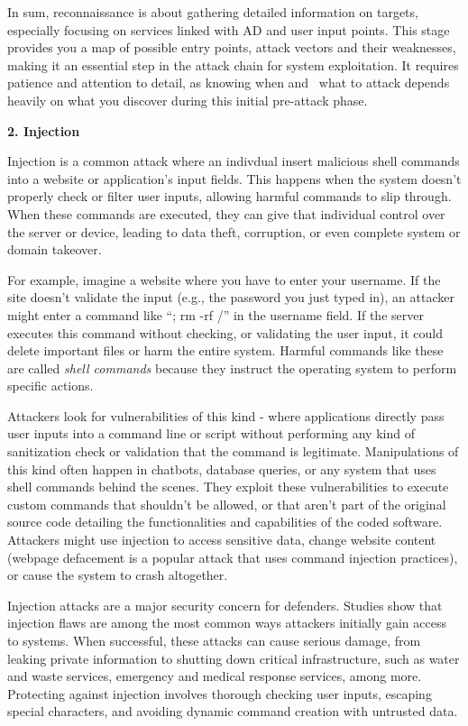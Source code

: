 In sum, reconnaissance is about gathering detailed information on targets, especially focusing on services linked with AD and user input points. This stage provides you a map of possible entry points, attack vectors and their weaknesses, making it an essential step in the attack chain for system exploitation. It requires patience and attention to detail, as knowing when and  what to attack depends heavily on what you discover during this initial pre-attack phase.

\textbf{2. Injection}

Injection is a common attack where an indivdual insert malicious shell commands into a website or application’s input fields. This happens when the system doesn’t properly check or filter user inputs, allowing harmful commands to slip through. When these commands are executed, they can give that individual control over the server or device, leading to data theft, corruption, or even complete system or domain takeover.

For example, imagine a website where you have to enter your username. If the site doesn’t validate the input (e.g., the password you just typed in), an attacker might enter a command like “; rm -rf /” in the username field. If the server executes this command without checking, or validating the user input, it could delete important files or harm the entire system. Harmful commands like these are called \textit{shell commands} because they instruct the operating system to perform specific actions.

Attackers look for vulnerabilities of this kind - where applications directly pass user inputs into a command line or script without performing any kind of sanitization check or validation that the command is legitimate. Manipulations of this kind often happen in chatbots, database queries, or any system that uses shell commands behind the scenes. They exploit these vulnerabilities to execute custom commands that shouldn’t be allowed, or that aren’t part of the original source code detailing the functionalities and capabilities of the coded software. Attackers might use injection to access sensitive data, change website content (webpage defacement is a popular attack that uses command injection practices), or cause the system to crash altogether.

Injection attacks are a major security concern for defenders. Studies show that injection flaws are among the most common ways attackers initially gain access to systems. When successful, these attacks can cause serious damage, from leaking private information to shutting down critical infrastructure, such as water and waste services, emergency and medical response services, among more. Protecting against injection involves thorough checking user inputs, escaping special characters, and avoiding dynamic command creation with untrusted data.

